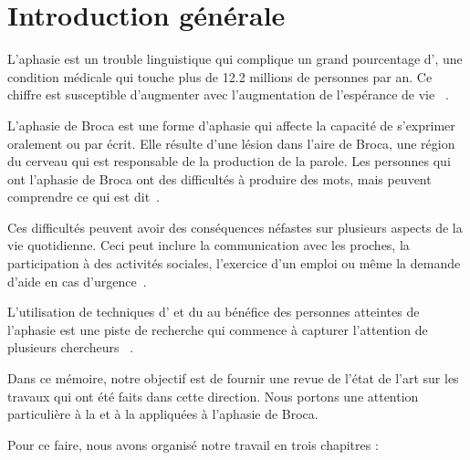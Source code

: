 \chapter*{Introduction générale}
\label{chap.intro}

L'aphasie est un trouble linguistique qui complique un grand pourcentage d',
une condition médicale qui touche plus de 12.2 millions de personnes par an.
Ce chiffre est susceptible d'augmenter avec l'augmentation de l'espérance de vie%
~\cite{Feigin_Brainin_Norrving_Martins_Sacco_Hacke_Fisher_Pandian_Lindsay_2022}.

L'aphasie de Broca est une forme d'aphasie qui affecte la capacité de s'exprimer oralement ou par écrit.
Elle résulte d'une lésion dans l'aire de Broca,
une région du cerveau qui est responsable de la production de la parole.
Les personnes qui ont l'aphasie de Broca ont des difficultés à produire des mots,
mais peuvent comprendre ce qui est dit~\cite{Chapey_2008}.

Ces difficultés peuvent avoir des conséquences néfastes sur plusieurs aspects de la vie quotidienne.
Ceci peut inclure la communication avec les proches,
la participation à des activités sociales,
l'exercice d'un emploi
ou même la demande d'aide en cas d'urgence~\cite{Hallowell_2017}.

L'utilisation de techniques d' et du  
au bénéfice des personnes atteintes de l'aphasie est une piste de recherche  
qui commence à capturer l'attention de plusieurs chercheurs%
~\cite{Smaili_Langlois_Pribil_2022,Qin_Lee_Kong_Lin_2022,Misra_Mishra_Gandhi_2022}.

Dans ce mémoire, notre objectif est de fournir une revue de l'état de l'art
sur les travaux qui ont été faits dans cette direction.
Nous portons une attention particulière à la  et à la 
appliquées à l'aphasie de Broca.

Pour ce faire, nous avons organisé notre travail en trois chapitres :

